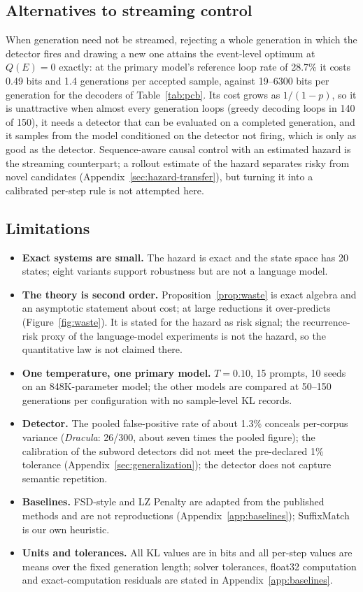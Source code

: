 \subsection{Alternatives to streaming control}\label{ssec:alternatives}
When generation need not be streamed, rejecting a whole generation in which the detector fires and drawing a new one attains the event-level optimum at $Q(E)=0$ exactly: at the primary model's reference loop rate of 28.7\% it costs 0.49 bits and 1.4 generations per accepted sample, against 19--6300 bits per generation for the decoders of Table~\ref{tab:pcb}. Its cost grows as $1/(1-p)$, so it is unattractive when almost every generation loops (greedy decoding loops in 140 of 150), it needs a detector that can be evaluated on a completed generation, and it samples from the model conditioned on the detector not firing, which is only as good as the detector. Sequence-aware causal control with an estimated hazard is the streaming counterpart; a rollout estimate of the hazard separates risky from novel candidates (Appendix~\ref{sec:hazard-transfer}), but turning it into a calibrated per-step rule is not attempted here.

\subsection{Limitations}
\begin{itemize}[leftmargin=*,itemsep=2pt]
\item \textbf{Exact systems are small.} The hazard is exact and the state space has 20 states; eight variants support robustness but are not a language model.
\item \textbf{The theory is second order.} Proposition~\ref{prop:waste} is exact algebra and an asymptotic statement about cost; at large reductions it over-predicts (Figure~\ref{fig:waste}). It is stated for the hazard as risk signal; the recurrence-risk proxy of the language-model experiments is not the hazard, so the quantitative law is not claimed there.
\item \textbf{One temperature, one primary model.} $T=0.10$, 15 prompts, 10 seeds on an 848K-parameter model; the other models are compared at 50--150 generations per configuration with no sample-level KL records.
\item \textbf{Detector.} The pooled false-positive rate of about 1.3\% conceals per-corpus variance (\emph{Dracula}: 26/300, about seven times the pooled figure); the calibration of the subword detectors did not meet the pre-declared 1\% tolerance (Appendix~\ref{sec:generalization}); the detector does not capture semantic repetition.
\item \textbf{Baselines.} FSD-style and LZ Penalty are adapted from the published methods and are not reproductions (Appendix~\ref{app:baselines}); SuffixMatch is our own heuristic.
\item \textbf{Units and tolerances.} All KL values are in bits and all per-step values are means over the fixed generation length; solver tolerances, float32 computation and exact-computation residuals are stated in Appendix~\ref{app:baselines}.
\end{itemize}

